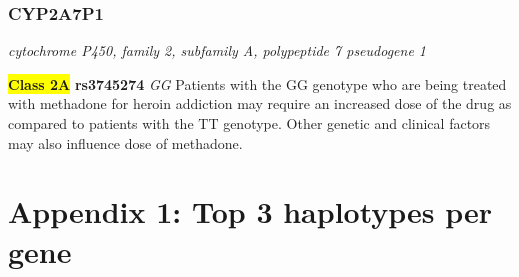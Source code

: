 \documentclass{report}
\begin{document}
\subsubsection{ CYP2A7P1 }
\textit{ cytochrome P450, family 2, subfamily A, polypeptide 7 pseudogene 1 } \newline




\textbf{\colorbox{yellow} {Class 2A}} \textbf{ rs3745274 } \textit{ GG }
Patients with the GG genotype who are being treated with methadone for heroin addiction may require an increased dose of the drug as compared to patients with the TT genotype. Other genetic and clinical factors may also influence dose of methadone.\newline

\newpage

\section{Appendix 1: Top 3 haplotypes per gene}
\scriptsize
\end{document}
